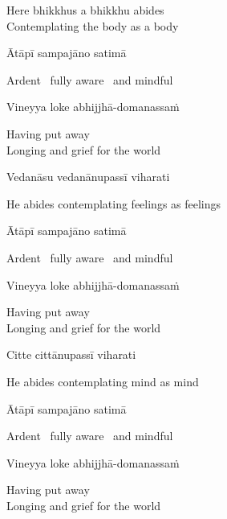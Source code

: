 \begin{english}
  Here bhikkhus a bhikkhu abides\\
  Contemplating the body as a body
\end{english}

Ātāpī sampajāno satimā

\begin{english}
  Ardent \breathmark\ fully aware \breathmark\ and mindful
\end{english}

Vineyya loke abhijjhā-domanassaṁ

\begin{english}
  Having put away\\
  Longing and grief for the world\makeatletter\hyperlink{endnote62-appendix}\makeatother
\end{english}

Vedanāsu vedanānupassī viharati

\begin{english}
  He abides contemplating feelings as feelings
\end{english}

Ātāpī sampajāno satimā

\begin{english}
  Ardent \breathmark\ fully aware \breathmark\ and mindful
\end{english}

Vineyya loke abhijjhā-domanassaṁ

\begin{english}
  Having put away\\
  Longing and grief for the world
\end{english}

Citte cittānupassī viharati

\begin{english}
  He abides contemplating mind as mind
\end{english}

Ātāpī sampajāno satimā

\begin{english}
  Ardent \breathmark\ fully aware \breathmark\ and mindful
\end{english}

Vineyya loke abhijjhā-domanassaṁ

\begin{english}
  Having put away\\
  Longing and grief for the world
\end{english}

